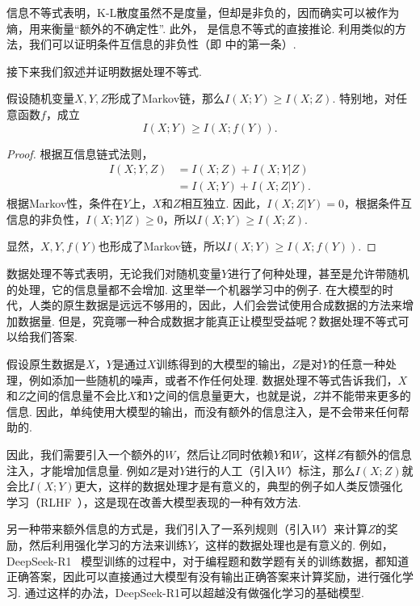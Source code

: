 信息不等式表明，K-L散度虽然不是度量，但却是非负的，因而确实可以被作为熵，用来衡量“额外的不确定性”. 此外， 是信息不等式的直接推论. 利用类似的方法，我们可以证明条件互信息的非负性（即 中的第一条）.

接下来我们叙述并证明数据处理不等式.
\begin{theorem}[数据处理不等式]\label{theorem:data-processing-inequality}
    假设随机变量$X,Y,Z$形成了Markov链，那么$I(X;Y)\geq I(X;Z)$. 特别地，对任意函数$f$，成立
    \[I(X;Y)\geq I(X;f(Y)).\]
\end{theorem}
\begin{proof}
根据互信息链式法则，
    \begin{align*}
        I(X;Y,Z)&=I(X;Z)+I(X;Y|Z)\\
        &=I(X;Y)+I(X;Z|Y).
    \end{align*}
根据Markov性，条件在$Y$上，$X$和$Z$相互独立. 因此，$I(X;Z|Y)=0$，根据条件互信息的非负性，$I(X;Y|Z)\geq0$，所以$I(X;Y)\geq I(X;Z)$.

显然，$X,Y,f(Y)$也形成了Markov链，所以$I(X;Y)\geq I(X;f(Y))$.
\end{proof}

数据处理不等式表明，无论我们对随机变量$Y$进行了何种处理，甚至是允许带随机的处理，它的信息量都不会增加. 这里举一个机器学习中的例子. 在大模型的时代，人类的原生数据是远远不够用的，因此，人们会尝试使用合成数据的方法来增加数据量. 但是，究竟哪一种合成数据才能真正让模型受益呢？数据处理不等式可以给我们答案. 

假设原生数据是$X$，$Y$是通过$X$训练得到的大模型的输出，$Z$是对$Y$的任意一种处理，例如添加一些随机的噪声，或者不作任何处理. 数据处理不等式告诉我们，$X$和$Z$之间的信息量不会比$X$和$Y$之间的信息量更大，也就是说，$Z$并不能带来更多的信息. 因此，单纯使用大模型的输出，而没有额外的信息注入，是不会带来任何帮助的.

因此，我们需要引入一个额外的$W$，然后让$Z$同时依赖$Y$和$W$，这样$Z$有额外的信息注入，才能增加信息量. 例如$Z$是对$Y$进行的人工（引入$W$）标注，那么$I(X;Z)$就会比$I(X;Y)$更大，这样的数据处理才是有意义的，典型的例子如人类反馈强化学习（RLHF~\cite{ouyangTrainingLanguageModels2022}），这是现在改善大模型表现的一种有效方法.

另一种带来额外信息的方式是，我们引入了一系列规则（引入$W$）来计算$Z$的奖励，然后利用强化学习的方法来训练$Y$，这样的数据处理也是有意义的. 例如，DeepSeek-R1~\cite{deepseek-aiDeepSeekR1IncentivizingReasoning2025} 模型训练的过程中，对于编程题和数学题有关的训练数据，都知道正确答案，因此可以直接通过大模型有没有输出正确答案来计算奖励，进行强化学习. 通过这样的办法，DeepSeek-R1可以超越没有做强化学习的基础模型. 

